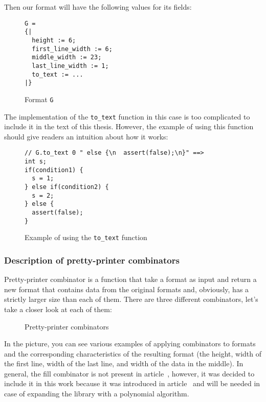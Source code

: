 \documentclass[14pt]{constructor-diploma}
\begin{document}
Then our format will have the following values for its fields:

\begin{figure}[H]
\begin{mdframed}[backgroundcolor=bg]
\begin{verbatim}
G = 
{|
  height := 6;
  first_line_width := 6;
  middle_width := 23;
  last_line_width := 1;
  to_text := ...
|}
\end{verbatim}
\end{mdframed}
\caption{Format \texttt{G}}
\end{figure}

The implementation of the \texttt{to\_text} function in this case is too complicated to include it in the text of this thesis. 
However, the example of using this function should give readers an intuition about how it works:
\begin{figure}[H]
    
\begin{mdframed}[backgroundcolor=bg]
\begin{verbatim}
// G.to_text 0 " else {\n  assert(false);\n}" ==>
int s;
if(condition1) { 
  s = 1; 
} else if(condition2) { 
  s = 2; 
} else {
  assert(false);
}
\end{verbatim}
\end{mdframed}
\caption{Example of using the \texttt{to\_text} function}
\end{figure}


\label{section_combinators}
\subsubsection{Description of pretty-printer combinators}

Pretty-printer combinator is a function that take a format as input and return a new format that contains data from the original formats and, 
obviously, has a strictly larger size than each of them. There are three different combinators, 
let's take a closer look at each of them:

\begin{figure}[H]

\caption{Pretty-printer combinators}
\end{figure}

In the picture, you can see various examples of applying combinators to formats 
and the corresponding characteristics of the resulting format 
(the height, width of the first line, width of the last line, and width of the data in the middle). 
In general, the fill combinator is not present in article~\cite{swierstra},
however, it was decided to include it in this work because it was introduced 
in article~\cites{podkopaev} and will be needed in case of expanding the library 
with a polynomial algorithm.
\end{document}
